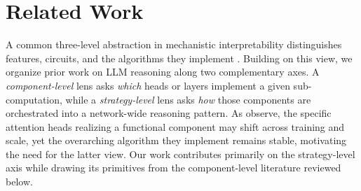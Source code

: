 \documentclass[11pt]{article}
\begin{document}
\section{Related Work}

A common three-level abstraction in mechanistic interpretability distinguishes features, circuits, and the algorithms they implement \citep{bereska2024mechanisticinterpretabilityaisafety}. Building on this view, we organize prior work on LLM reasoning along two complementary axes. 
A \textit{component-level} lens asks \textit{which} heads or layers implement a given sub-computation, while a \textit{strategy-level} lens asks \textit{how} those components are orchestrated into a network-wide reasoning pattern. 
As \citet{NEURIPS2024_47c7edad} observe, the specific attention heads realizing a functional component may shift across training and scale, yet the overarching algorithm they implement remains stable, motivating the need for the latter view. Our work contributes primarily on the strategy-level axis while drawing its primitives from the component-level literature reviewed below.
\end{document}
